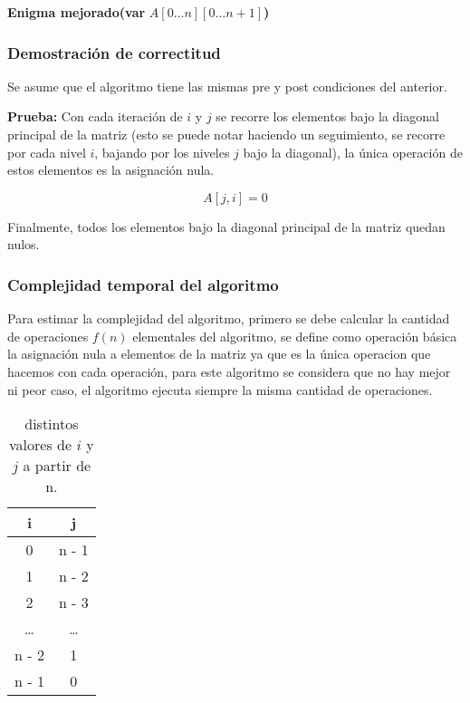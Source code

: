 \documentclass[11pt]{article}
\begin{document}
\begin{algorithm}[H]
\caption{\textbf{Enigma mejorado}\textbf{(var} $A[0 \dots n][0 \dots n + 1]$\textbf{)}}

\end{algorithm}
\subsubsection{Demostración de correctitud}
Se asume que el algoritmo tiene las mismas pre y post condiciones del anterior.

\textbf{Prueba:} 
Con cada iteración de \(i\) y \(j\) se recorre los elementos bajo la diagonal principal de la matriz (esto se puede notar haciendo un seguimiento, se recorre por cada nivel \(i\), bajando por los niveles \(j\) bajo la diagonal), la única operación de estos elementos es la asignación nula.

\[A[j,i] = 0 \]
 
Finalmente, todos los elementos bajo la diagonal principal de la matriz quedan nulos.
\subsubsection{Complejidad temporal del algoritmo}
Para estimar la complejidad del algoritmo, primero se debe calcular la cantidad de operaciones \(f(n)\) elementales del algoritmo, se define como operación básica la asignación nula a elementos de la matriz ya que es la única operacion que hacemos con cada operación, para este algoritmo se considera que no hay mejor ni peor caso, el algoritmo ejecuta siempre la misma cantidad de operaciones. 

\begin{table}[h!]
\centering
\begin{tabular}{||c c||}
\hline 
\textbf{i}  &\textbf{j}  \\[0.5ex] \hline\hline
0  & n - 1 \\ \hline 
1  & n - 2 \\ \hline 
2 & n - 3  \\ \hline 
\dots  & \dots \\ \hline 
n - 2  &1 \\ \hline 
n - 1  &0  \\ \hline 
\end{tabular} 
\caption{distintos valores de \(i\) y \(j\)  a partir de n.}

\end{table}
\end{document}
